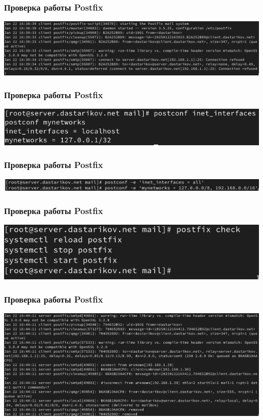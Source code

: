 \begin{frame}
\frametitle{Проверка работы Postfix}
    \centering
    \includegraphics[width=\textwidth]{../images/image15.png}
\end{frame}
\begin{frame}
\frametitle{Проверка работы Postfix}
    \centering
    \includegraphics[width=\textwidth]{../images/image16.png}
\end{frame}
\begin{frame}
\frametitle{Проверка работы Postfix}
    \centering
    \includegraphics[width=\textwidth]{../images/image17.png}
\end{frame}
\begin{frame}
\frametitle{Проверка работы Postfix}
    \centering
    \includegraphics[width=\textwidth]{../images/image18.png}
\end{frame}
\begin{frame}
\frametitle{Проверка работы Postfix}
    \centering
    \includegraphics[width=\textwidth]{../images/image19.png}
\end{frame}
